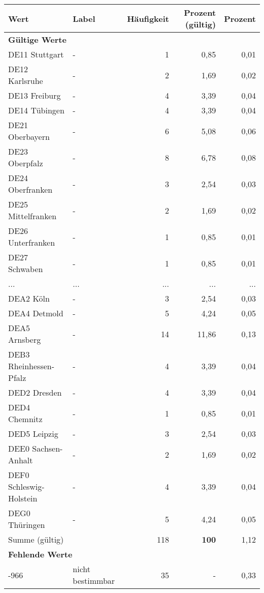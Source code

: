      \begin{longtable}{Xlrrr}
     \toprule
     \textbf{Wert} & \textbf{Label} & \textbf{Häufigkeit} & \textbf{Prozent (gültig)} & \textbf{Prozent} \\
     \endhead
     \midrule
     \multicolumn{5}{l}{\textbf{Gültige Werte}}\\
        \multicolumn{1}{X}{DE11 Stuttgart} & - & 1 & 0,85 & 0,01 \\
        \multicolumn{1}{X}{DE12 Karlsruhe} & - & 2 & 1,69 & 0,02 \\
        \multicolumn{1}{X}{DE13 Freiburg} & - & 4 & 3,39 & 0,04 \\
        \multicolumn{1}{X}{DE14 Tübingen} & - & 4 & 3,39 & 0,04 \\
        \multicolumn{1}{X}{DE21 Oberbayern} & - & 6 & 5,08 & 0,06 \\
        \multicolumn{1}{X}{DE23 Oberpfalz} & - & 8 & 6,78 & 0,08 \\
        \multicolumn{1}{X}{DE24 Oberfranken} & - & 3 & 2,54 & 0,03 \\
        \multicolumn{1}{X}{DE25 Mittelfranken} & - & 2 & 1,69 & 0,02 \\
        \multicolumn{1}{X}{DE26 Unterfranken} & - & 1 & 0,85 & 0,01 \\
        \multicolumn{1}{X}{DE27 Schwaben} & - & 1 & 0,85 & 0,01 \\
       ... & ... & ... & ... & ... \\
        \multicolumn{1}{X}{DEA2 Köln} & - & 3 & 2,54 & 0,03 \\
        \multicolumn{1}{X}{DEA4 Detmold} & - & 5 & 4,24 & 0,05 \\
        \multicolumn{1}{X}{DEA5 Arnsberg} & - & 14 & 11,86 & 0,13 \\
        \multicolumn{1}{X}{DEB3 Rheinhessen-Pfalz} & - & 4 & 3,39 & 0,04 \\
        \multicolumn{1}{X}{DED2 Dresden} & - & 4 & 3,39 & 0,04 \\
        \multicolumn{1}{X}{DED4 Chemnitz} & - & 1 & 0,85 & 0,01 \\
        \multicolumn{1}{X}{DED5 Leipzig} & - & 3 & 2,54 & 0,03 \\
        \multicolumn{1}{X}{DEE0 Sachsen-Anhalt} & - & 2 & 1,69 & 0,02 \\
        \multicolumn{1}{X}{DEF0 Schleswig-Holstein} & - & 4 & 3,39 & 0,04 \\
        \multicolumn{1}{X}{DEG0 Thüringen} & - & 5 & 4,24 & 0,05 \\
     \midrule
      \multicolumn{2}{l}{Summe (gültig)} & 118 &
      \textbf{100} &
         1,12 \\
     \multicolumn{5}{l}{\textbf{Fehlende Werte}}\\
       -966 & nicht bestimmbar & 35 & - & 0,33 \\


\end{longtable}
